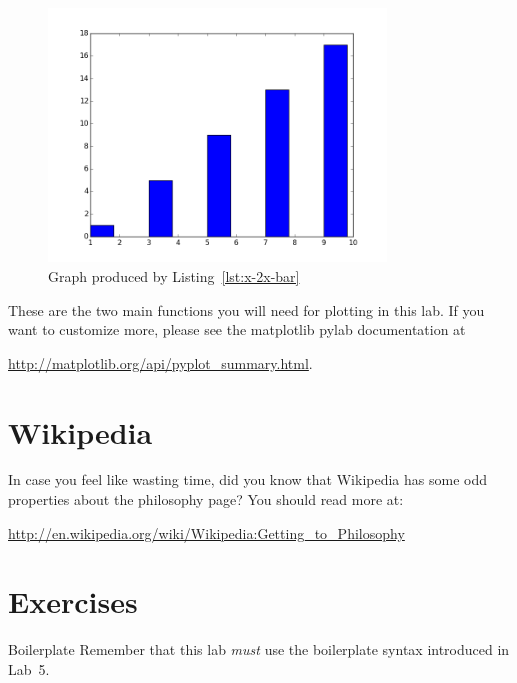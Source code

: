 \documentclass[11pt]{cselabheader}
\begin{document}
\begin{figure}[!ht]
  \centering
  \includegraphics[width=0.8\textwidth]{lab11/x-2x-bar-plot.png}
  \caption{Graph produced by Listing~\ref{lst:x-2x-bar}}
  \label{fig:x-2x-bar}
\end{figure}

These are the two main functions you will need for plotting in this lab. If you
want to customize more, please see the matplotlib pylab documentation at
\begin{center}
  \url{http://matplotlib.org/api/pyplot_summary.html}.
\end{center}

\pagebreak
\section{Wikipedia}

In case you feel like wasting time, did you know that Wikipedia has some odd
properties about the philosophy page? You should read more at:

\begin{center}
  \url{http://en.wikipedia.org/wiki/Wikipedia:Getting_to_Philosophy}
\end{center}

\pagebreak
\section{Exercises}
\label{sec:ex}


\begin{warningbox}{Boilerplate}
  Remember that this lab \emph{must} use the
  boilerplate syntax introduced in Lab~5.
\end{warningbox}
\end{document}
